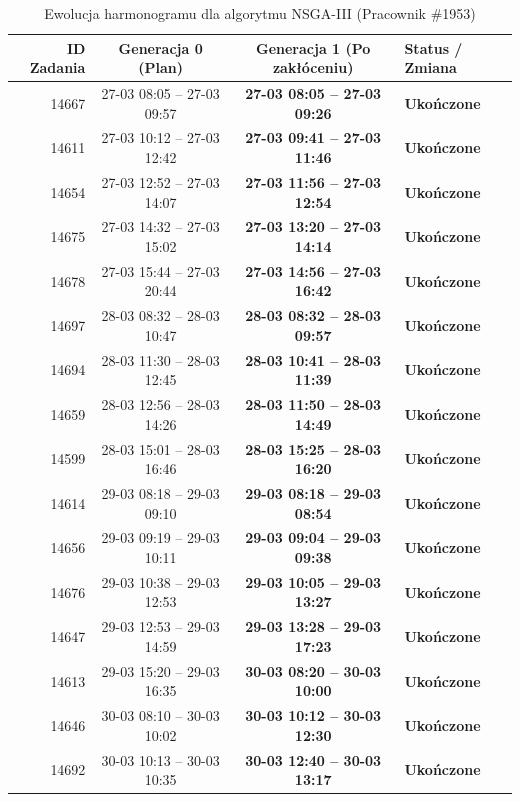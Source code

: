 \begin{table}[htbp]
\centering\small
\caption{Ewolucja harmonogramu dla algorytmu NSGA-III (Pracownik \#1953)}
\label{tab:case_study_nsgaiii_u1953}
\begin{tabular}{|r|c|c|l|}
\hline
\textbf{ID Zadania} & \textbf{Generacja 0 (Plan)} & \textbf{Generacja 1 (Po zakłóceniu)} & \textbf{Status / Zmiana} \\ \hline
14667 & 27-03 08:05 -- 27-03 09:57 & \textbf{27-03 08:05 -- 27-03 09:26} & \textbf{Ukończone} \\ 
14611 & 27-03 10:12 -- 27-03 12:42 & \textbf{27-03 09:41 -- 27-03 11:46} & \textbf{Ukończone} \\ 
14654 & 27-03 12:52 -- 27-03 14:07 & \textbf{27-03 11:56 -- 27-03 12:54} & \textbf{Ukończone} \\ 
14675 & 27-03 14:32 -- 27-03 15:02 & \textbf{27-03 13:20 -- 27-03 14:14} & \textbf{Ukończone} \\ 
14678 & 27-03 15:44 -- 27-03 20:44 & \textbf{27-03 14:56 -- 27-03 16:42} & \textbf{Ukończone} \\ 
14697 & 28-03 08:32 -- 28-03 10:47 & \textbf{28-03 08:32 -- 28-03 09:57} & \textbf{Ukończone} \\ 
14694 & 28-03 11:30 -- 28-03 12:45 & \textbf{28-03 10:41 -- 28-03 11:39} & \textbf{Ukończone} \\ 
14659 & 28-03 12:56 -- 28-03 14:26 & \textbf{28-03 11:50 -- 28-03 14:49} & \textbf{Ukończone} \\ 
14599 & 28-03 15:01 -- 28-03 16:46 & \textbf{28-03 15:25 -- 28-03 16:20} & \textbf{Ukończone} \\ 
14614 & 29-03 08:18 -- 29-03 09:10 & \textbf{29-03 08:18 -- 29-03 08:54} & \textbf{Ukończone} \\ 
14656 & 29-03 09:19 -- 29-03 10:11 & \textbf{29-03 09:04 -- 29-03 09:38} & \textbf{Ukończone} \\ 
14676 & 29-03 10:38 -- 29-03 12:53 & \textbf{29-03 10:05 -- 29-03 13:27} & \textbf{Ukończone} \\ 
14647 & 29-03 12:53 -- 29-03 14:59 & \textbf{29-03 13:28 -- 29-03 17:23} & \textbf{Ukończone} \\ 
14613 & 29-03 15:20 -- 29-03 16:35 & \textbf{30-03 08:20 -- 30-03 10:00} & \textbf{Ukończone} \\ 
14646 & 30-03 08:10 -- 30-03 10:02 & \textbf{30-03 10:12 -- 30-03 12:30} & \textbf{Ukończone} \\ 
14692 & 30-03 10:13 -- 30-03 10:35 & \textbf{30-03 12:40 -- 30-03 13:17} & \textbf{Ukończone} \\ 

\end{tabular}
\end{table}
